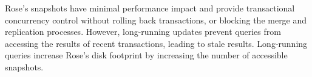 \documentclass{vldb}
\newcommand{\rows}{Rose\xspace}
\newcommand{\rowss}{Rose's\xspace}
\begin{document}
\rowss snapshots have minimal performance impact and provide
transactional concurrency control without rolling back transactions,
or blocking the merge and replication processes.  However,
long-running updates prevent queries from accessing the results of
recent transactions, leading to stale results.  Long-running queries
increase \rowss disk footprint by increasing the number of accessible
snapshots.



\end{document}
